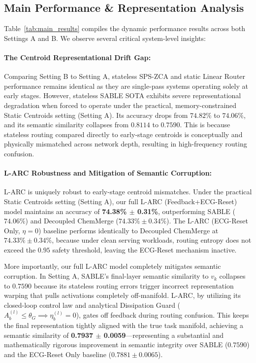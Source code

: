 \subsection{Main Performance \& Representation Analysis}
Table~\ref{tab:main_results} compiles the dynamic performance results across both Settings A and B. We observe several critical system-level insights:

\paragraph{The Centroid Representational Drift Gap:}
Comparing Setting B to Setting A, stateless SPS-ZCA and static Linear Router performance remains identical as they are single-pass systems operating solely at early stages. However, stateless SABLE SOTA exhibits severe representational degradation when forced to operate under the practical, memory-constrained Static Centroids setting (Setting A). Its accuracy drops from $74.82\%$ to $74.06\%$, and its semantic similarity collapses from $0.8114$ to $0.7590$. This is because stateless routing compared directly to early-stage centroids is conceptually and physically mismatched across network depth, resulting in high-frequency routing confusion.

\paragraph{L-ARC Robustness and Mitigation of Semantic Corruption:}
L-ARC is uniquely robust to early-stage centroid mismatches. Under the practical Static Centroids setting (Setting A), our full L-ARC (Feedback+ECG-Reset) model maintains an accuracy of \textbf{74.38\% $\pm$ 0.31\%}, outperforming SABLE ($74.06\%$) and Decoupled ChemMerge ($74.33\% \pm 0.34\%$). The L-ARC (ECG-Reset Only, $\eta=0$) baseline performs identically to Decoupled ChemMerge at $74.33\% \pm 0.34\%$, because under clean serving workloads, routing entropy does not exceed the $0.95$ safety threshold, leaving the ECG-Reset mechanism inactive. 

More importantly, our full L-ARC model completely mitigates semantic corruption. In Setting A, SABLE's final-layer semantic similarity to $v_k$ collapses to $0.7590$ because its stateless routing errors trigger incorrect representation warping that pulls activations completely off-manifold. L-ARC, by utilizing its closed-loop control law and analytical Dissipation Guard ($A_b^{(l)} \le \theta_G \implies \eta_b^{(l)} = 0$), gates off feedback during routing confusion. This keeps the final representation tightly aligned with the true task manifold, achieving a semantic similarity of \textbf{0.7937 $\pm$ 0.0059}—representing a substantial and mathematically rigorous improvement in semantic integrity over SABLE ($0.7590$) and the ECG-Reset Only baseline ($0.7881 \pm 0.0065$).

